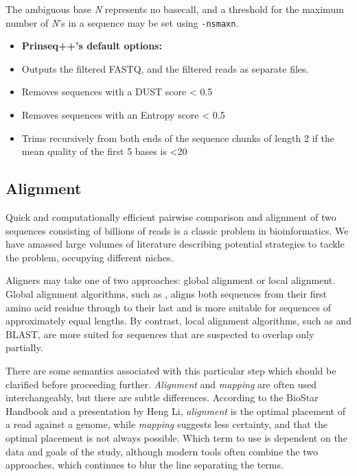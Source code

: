 The ambiguous base \textit{N} represents no basecall, and a threshold for the maximum number of \textit{N}'s in a sequence may be set using \texttt{-ns\textunderscore max\textunderscore n}.
    
\begin{itemize}\itemsep0em
\item[]\textbf{Prinseq++'s default options:}
\item Outputs the filtered FASTQ, and the filtered reads as separate files.
\item Removes sequences with a DUST score < 0.5
\item Removes sequences with an Entropy score < 0.5 
\item Trims recursively from both ends of the sequence chunks of length 2 if the mean quality of the first 5 bases is <20 
\end{itemize}

\subsection{Alignment}

Quick and computationally efficient pairwise comparison and alignment of two sequences consisting of billions of reads is a classic problem in bioinformatics. We have amassed large volumes of literature describing potential strategies to tackle the problem, occupying different niches.

Aligners may take one of two approaches: global alignment or local alignment. Global alignment algorithms, such as \cite{needleman1970general}, aligns both sequences from their first amino acid residue through to their last and is more suitable for sequences of approximately equal lengths. By contrast, local alignment algorithms, such as \cite{smith1981identification} and BLAST, are more suited for sequences that are suspected to overlap only partially. 

There are some semantics associated with this particular step which should be clarified before proceeding further. \textit{Alignment} and \textit{mapping} are often used interchangeably, but there are subtle differences. According to the BioStar Handbook \citep{albert2020biostar} and a presentation by Heng Li, \textit{alignment} is the optimal placement of a read against a genome, while \textit{mapping} suggests less certainty, and that the optimal placement is not always possible. Which term to use is dependent on the data and goals of the study, although modern tools often combine the two approaches, which continues to blur the line separating the terms.

